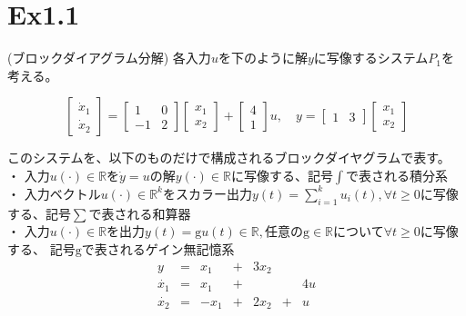 \documentclass{jsarticle}
\begin{document}

\section*{Ex1.1}
(ブロックダイアグラム分解)
各入力$u$を下のように解$y$に写像するシステム$P_1$を考える。

\begin{equation}
  \left[\begin{array}{l}
  \dot{x}_{1} \\
  \dot{x}_{2}
  \end{array}\right]=\left[\begin{array}{cc}
  1 & 0 \\
  -1 & 2
  \end{array}\right]\left[\begin{array}{l}
  x_{1} \\
  x_{2}
  \end{array}\right]+\left[\begin{array}{l}
  4 \\
  1
  \end{array}\right] u, \quad y=\left[\begin{array}{ll}
  1 & 3
  \end{array}\right]\left[\begin{array}{l}
  x_{1} \\
  x_{2}
  \end{array}\right]
\end{equation}

このシステムを、以下のものだけで構成されるブロックダイヤグラムで表す。\\
・ 入力$u(\cdot)\in \mathbb{R}$を$\dot{y}=u$の解$y(\cdot)\in \mathbb{R}$に写像する、記号$\int$で表される積分系
\\
・ 入力ベクトル$u(\cdot)\in \mathbb{R}^k$をスカラー出力$y(t)=\sum^k_{i=1}u_i(t),\forall t \geq 0$に写像する、記号$\sum$で表される和算器\\
・ 入力$u(\cdot)\in \mathbb{R}$を出力$y(t) = \mathrm{g} u(t) \in \mathbb{R},$任意の$\mathrm{g}\in \mathbb{R}$について$ \forall t \geq 0$に写像する、
記号$\mathrm{g}$で表されるゲイン無記憶系\\


\begin{equation}
  \begin{aligned}
    y\; &=& x_1 &+& 3x_2 \\
    \dot{x_1} &=& x_1&+&&&  4u \\
    \dot{x_2} &=& -x_1 &+& 2x_2 &+& u\\
  \end{aligned}
\end{equation}
\end{document}
